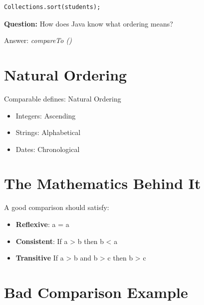 \documentclass[11pt,a4paper]{book}
\begin{document}
\begin{verbatim} 
Collections.sort(students);
\end{verbatim}

\textbf{Question:}
How does Java know
what ordering means?


\textcolor{RosettaDeepGreen}{Answer}:
\emph{\textcolor{RosettaRoyalPurple}{compareTo} ()}

\section{Natural Ordering}

Comparable defines:
Natural Ordering
\begin{itemize}
\item Integers: 
Ascending
\item Strings:
Alphabetical
\item Dates:
Chronological
\end{itemize}

\section{The Mathematics Behind It}

A good comparison should satisfy:
\begin{itemize}
\item \textbf{Reflexive}: \textcolor{RosettaSeaGreen}{ a = a }
\item \textbf{Consistent}: 
If
\textcolor{RosettaSeaGreen}{ a > b } then
\textcolor{RosettaSeaGreen}{ b < a }
\item \textbf{Transitive}
If
\textcolor{RosettaSeaGreen}{ a > b } and
\textcolor{RosettaSeaGreen}{ b > c } then
\textcolor{RosettaSeaGreen}{ b > c }
\end{itemize}
\section{Bad Comparison Example}
\end{document}
